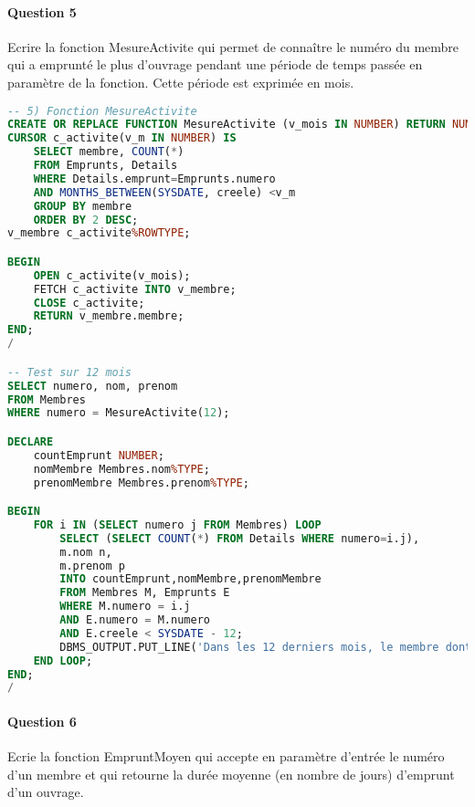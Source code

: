 \documentclass[10pt, oneside]{article}
\begin{document}

\paragraph{Question 5} Ecrire la fonction MesureActivite qui permet de connaître le numéro du membre qui a emprunté le plus d'ouvrage pendant une période de temps passée en paramètre de la fonction. Cette période est exprimée en mois.

\begin{lstlisting}[language=sql, title=Question 5, label=QV5]
-- 5) Fonction MesureActivite
CREATE OR REPLACE FUNCTION MesureActivite (v_mois IN NUMBER) RETURN NUMBER IS
CURSOR c_activite(v_m IN NUMBER) IS
	SELECT membre, COUNT(*)
	FROM Emprunts, Details
	WHERE Details.emprunt=Emprunts.numero
	AND MONTHS_BETWEEN(SYSDATE, creele) <v_m
	GROUP BY membre
	ORDER BY 2 DESC;
v_membre c_activite%ROWTYPE;

BEGIN
	OPEN c_activite(v_mois);
	FETCH c_activite INTO v_membre;
	CLOSE c_activite;
	RETURN v_membre.membre;
END;
/

-- Test sur 12 mois
SELECT numero, nom, prenom
FROM Membres
WHERE numero = MesureActivite(12);

DECLARE
	countEmprunt NUMBER;
	nomMembre Membres.nom%TYPE;
	prenomMembre Membres.prenom%TYPE;

BEGIN
	FOR i IN (SELECT numero j FROM Membres) LOOP
		SELECT (SELECT COUNT(*) FROM Details WHERE numero=i.j),
		m.nom n, 
		m.prenom p 
		INTO countEmprunt,nomMembre,prenomMembre
		FROM Membres M, Emprunts E
		WHERE M.numero = i.j 
		AND E.numero = M.numero
		AND E.creele < SYSDATE - 12;
		DBMS_OUTPUT.PUT_LINE('Dans les 12 derniers mois, le membre dont le prenom est ' ||prenomMembre || ' et le nom ' ||nomMembre|| ' a emprunte en tout ' ||countEmprunt || ' livres.');
	END LOOP;
END;
/
\end{lstlisting}


\paragraph{Question 6} Ecrie la fonction EmpruntMoyen qui accepte en paramètre d'entrée le numéro d'un membre et qui retourne la durée moyenne (en nombre de jours) d'emprunt d'un ouvrage.
\end{document}
